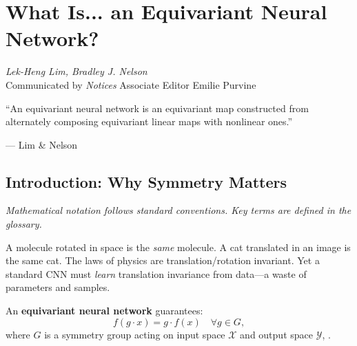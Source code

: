 \chapter{What Is... an Equivariant Neural Network?}
\label{ch:equivariant} \cite{lim2023equivariant}

\begin{flushright}
\textit{Lek-Heng Lim, Bradley J. Nelson}\\
Communicated by \textit{Notices} Associate Editor Emilie Purvine
\end{flushright}

\epigraph{``An equivariant neural network is an equivariant map constructed from alternately composing equivariant linear maps with nonlinear ones.''}{--- Lim \& Nelson} \cite{lim2023equivariant}

\begin{abstract}
Symmetry is everywhere in science: molecular structures, physical laws, images. Standard neural networks ignore symmetry, wasting capacity learning what physics already dictates. Equivariant neural networks bake symmetry into the architecture: if the input transforms, the output transforms predictably. This chapter gives the mathematical foundation: group representations, intertwining operators, and the universal approximation theorem for equivariant networks, \cite{lim2023equivariant}.
\end{abstract}

\section{Introduction: Why Symmetry Matters}

\noindent\textit{Mathematical notation follows standard conventions. Key terms are defined in the glossary.}\n
\label{sec:eq:intro}

A molecule rotated in space is the \emph{same} molecule. A cat translated in an image is the same cat. The laws of physics are translation/rotation invariant. Yet a standard CNN must \emph{learn} translation invariance from data---a waste of parameters and samples.

An \textbf{equivariant neural network} guarantees: \cite{lim2023equivariant}
\[
f(g \cdot x) = g \cdot f(x) \quad \forall g \in G,
\]
where $G$ is a symmetry group acting on input space $\mathcal{X}$ and output space $\mathcal{Y}$, \cite{lim2023equivariant}.

